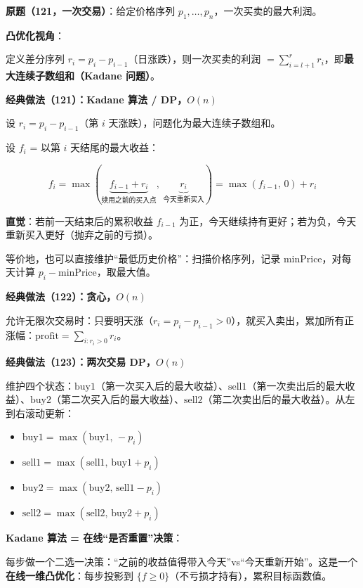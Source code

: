 \documentclass[12pt, a4paper]{ctexart}
\begin{document}
\begin{blackboard}

\textbf{原题（121，一次交易）}：给定价格序列 $p_1, \ldots, p_n$，一次买卖的最大利润。

\textbf{凸优化视角}：

定义差分序列 $r_i = p_i - p_{i-1}$（日涨跌），则一次买卖的利润 $= \sum_{i=l+1}^{r} r_i$，即\textbf{最大连续子数组和（Kadane 问题）}。

\textbf{经典做法（121）：Kadane 算法 / DP，$O(n)$}

设 $r_i = p_i - p_{i-1}$（第 $i$ 天涨跌），问题化为最大连续子数组和。

设 $f_i$ = 以第 $i$ 天结尾的最大收益：

$$f_i = \max(\underbrace{f_{i-1} + r_i}_{\text{续用之前的买入点}},\ \underbrace{r_i}_{\text{今天重新买入}}) = \max(f_{i-1},\, 0) + r_i$$

\textbf{直觉}：若前一天结束后的累积收益 $f_{i-1}$ 为正，今天继续持有更好；若为负，今天重新买入更好（抛弃之前的亏损）。

等价地，也可以直接维护``最低历史价格''：扫描价格序列，记录 $\text{minPrice}$，对每天计算 $p_i - \text{minPrice}$，取最大值。

\textbf{经典做法（122）：贪心，$O(n)$}

允许无限次交易时：只要明天涨（$r_i = p_i - p_{i-1} > 0$），就买入卖出，累加所有正涨幅：$\text{profit} = \sum_{i: r_i > 0} r_i$。

\textbf{经典做法（123）：两次交易 DP，$O(n)$}

维护四个状态：$\text{buy1}$（第一次买入后的最大收益）、$\text{sell1}$（第一次卖出后的最大收益）、$\text{buy2}$（第二次买入后的最大收益）、$\text{sell2}$（第二次卖出后的最大收益）。从左到右滚动更新：
\begin{itemize}
    \item $\text{buy1} = \max(\text{buy1},\, -p_i)$
    \item $\text{sell1} = \max(\text{sell1},\, \text{buy1}+p_i)$
    \item $\text{buy2} = \max(\text{buy2},\, \text{sell1}-p_i)$
    \item $\text{sell2} = \max(\text{sell2},\, \text{buy2}+p_i)$
\end{itemize}

\textbf{Kadane 算法 = 在线``是否重置''决策}：

每步做一个二选一决策：``之前的收益值得带入今天''vs``今天重新开始''。这是一个\textbf{在线一维凸优化}：每步投影到 $\{f \geq 0\}$（不亏损才持有），累积目标函数值。


\end{blackboard}
\end{document}
